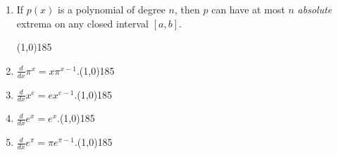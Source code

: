 \documentclass[12 pt]{article}
\newenvironment{tfenum}{
	\begin{enumerate}[label={(\alph*)}]
		\setlength{\itemsep}{6pt}
		\setlength{\parskip}{10pt}
		\setlength{\parsep}{0pt}}
	{\end{enumerate}}
\newcommand{\ti}[1]{\textit{#1}}
\begin{document}
\begin{enumerate}[resume, leftmargin=-0.25in, rightmargin=-0.25in]
\begin{tfenum}
	\item If $p(x)$ is a polynomial of degree $n$, then $p$ can have at most $n$ \ti{absolute} extrema on any closed interval $[a,b]$.\vspace{-8mm}	\begin{flushright}\line(1,0){185}\end{flushright}\vspace{-3mm}
	\item $\frac{d}{dx}\pi^x=x\pi^{x-1}$.\hfill\line(1,0){185}\vspace{-3mm}
	\item $\frac{d}{dx}x^e=ex^{e-1}$.\hfill\line(1,0){185}\vspace{-3mm}
	\item $\frac{d}{dx}e^x=e^x$.\hfill\line(1,0){185}\vspace{-3mm}
	\item $\frac{d}{dx}e^\pi=\pi e^{\pi-1}$.\hfill\line(1,0){185}
\end{tfenum}
\end{enumerate}
\end{document}
